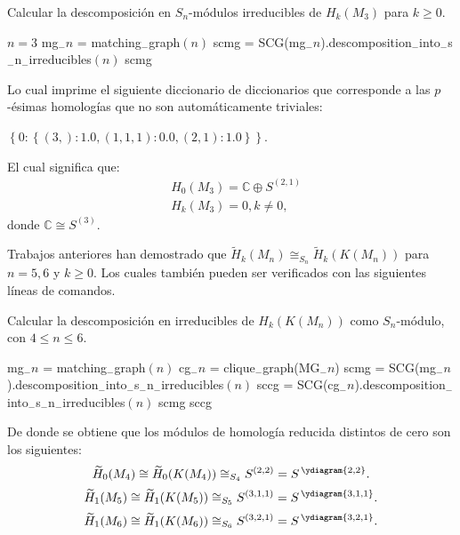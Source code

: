 \documentclass[12pt]{book}
\theoremstyle{definition}
\newcounter{in}
\begin{document}
\begin{algorithm}[H]
\caption{Calcular la descomposición en $S_n$-módulos irreducibles de $H_{k}(M_3)$ para $k \geq  0$.}
\begin{algorithmic}
\STATE $n = 3$
\STATE mg$_{-}n$ = matching$_{-}$graph$(n)$
\STATE scmg = SCG(mg$_{-}n$).descomposition$_{-}$into$_{-}$s$_{-}$n$_{-}$irreducibles$(n)$
\PRINT scmg 
\end{algorithmic}
\end{algorithm}


Lo cual imprime el siguiente diccionario de diccionarios que
corresponde a las $p$-ésimas homologías que no son automáticamente
triviales:

$ \left \{0: \left \{(3,): 1.0,(1,1,1): 0.0,(2,1): 1.0 \right \}
\right \}$.

El cual significa que:
\begin{align*}
& H_{0}(M_{3})=\mathbb{C} \oplus S^{(2,1)}\\
& H_{k}(M_{3}) = 0, k \neq 0,
\end{align*}
donde $\mathbb{C} \cong S^{(3)}$.

Trabajos anteriores han demostrado que
$\widetilde H_{k}(M_{n})\cong_{S_n} \widetilde H_{k}(K(M_{n}))$ para
$n=5,6$ y $k\geq0$. Los cuales también pueden ser verificados con las
siguientes líneas de comandos.
\begin{algorithm}[H]
\caption{Calcular la descomposición en irreducibles de $H_{k}(K(M_n))$ como $S_n$-módulo, con $4 \leq n \leq 6$.}
\begin{algorithmic}
\STATE mg$_{-}n$ = matching$_{-}$graph$(n)$
\STATE cg$_{-}n$ = clique$_{-}$graph(MG$_{-}n$)
\STATE scmg = SCG(mg$_{-}n$).descomposition$_{-}$into$_{-}$s$_{-}$n$_{-}$irreducibles$(n)$
\STATE sccg = SCG(cg$_{-}n$).descomposition$_{-}$into$_{-}$s$_{-}$n$_{-}$irreducibles$(n)$
\PRINT scmg
\PRINT sccg
\ENDFOR
\end{algorithmic}
\end{algorithm}
De donde se obtiene que los módulos de homología reducida distintos de
cero son los siguientes: 
\begin{equation}
  \widetilde H_{0}(M_{4})\cong\widetilde H_{0}(K(M_{4}))\cong_{S_{4}} S^{(2,2)}= S^{\,\ydiagram{2,2}}.
\end{equation}
\begin{equation}
  \widetilde H_{1}(M_{5})\cong\widetilde H_{1}(K(M_{5}))\cong_{S_{5}} S^{(3,1,1)}=S^{\,\ydiagram{3,1,1}}.
\end{equation}
\begin{equation}
  \widetilde H_{1}(M_{6})\cong\widetilde H_{1}(K(M_{6}))\cong_{S_{6}} S^{(3,2,1)}=S^{\,\ydiagram{3,2,1}}.
\end{equation}
\end{document}
